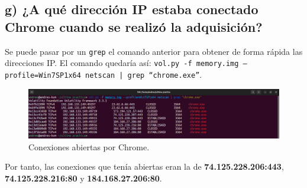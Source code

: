 \documentclass{article}
\begin{document}
\subsection{g) ¿A qué dirección IP estaba conectado Chrome cuando se realizó la adquisición?}

Se puede pasar por un \verb|grep| el comando anterior para obtener de forma rápida las direcciones IP. El comando quedaría así: \texttt{vol.py -f memory.img --profile=Win7SP1x64 netscan | grep ``chrome.exe''}.

\begin{figure}[H]
    \centering
    \includegraphics[width=\textwidth]{imagenes/Captura desde 2022-12-07 10-17-28.png}
    \caption{Conexiones abiertas por Chrome.}
\end{figure}

Por tanto, las conexiones que tenía abiertas eran la de \textbf{74.125.228.206:443}, \textbf{74.125.228.216:80} y \textbf{184.168.27.206:80}.
\end{document}
